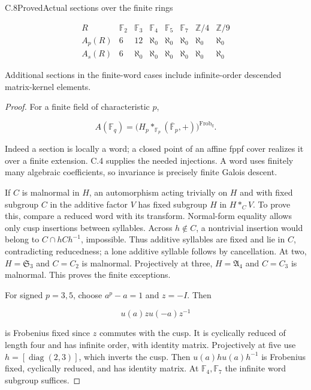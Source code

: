 \begin{statement}{C.8}{Proved}{Actual sections over the finite rings}

$$
\begin{array}{c|rrrrrrr}
R&\mathbb F_2&\mathbb F_3&\mathbb F_4&\mathbb F_5&\mathbb F_7&
\mathbb Z/4&\mathbb Z/9\\\hline
A_p(R)&6&12&\aleph_0&\aleph_0&\aleph_0&\aleph_0&\aleph_0\\
A_s(R)&6&\aleph_0&\aleph_0&\aleph_0&\aleph_0&\aleph_0&\aleph_0
\end{array}
$$

Additional sections in the finite-word cases include
infinite-order descended matrix-kernel elements.
\end{statement}
\begin{proof}
For a finite field of characteristic $p$,

$$
A(\mathbb F_q)=
 \bigl(H_p*_{\mathbb F_p}(\overline{\mathbb F}_p,+)\bigr)
 ^{\operatorname{Frob}_q}.
$$

Indeed a section is locally a word; a closed point of an affine
fppf cover realizes it over a finite extension.
C.4 supplies the needed injections. A word uses finitely
many algebraic coefficients, so invariance is precisely finite
Galois descent.

If $C$ is malnormal in $H$, an automorphism acting trivially
on $H$ and with fixed subgroup $C$ in the additive factor
$V$ has fixed subgroup $H$ in $H*_C V$.
To prove this, compare a reduced word with its transform.
Normal-form equality allows only cusp insertions between
syllables. Across $h\notin C$, a nontrivial insertion would
belong to $C\cap hCh^{-1}$, impossible.
Thus additive syllables are fixed and lie in $C$, contradicting
reducedness; a lone additive syllable follows by cancellation.
At two, $H=\mathfrak S_3$ and $C=C_2$ is malnormal.
Projectively at three, $H=\mathfrak A_4$ and $C=C_3$
is malnormal. This proves the finite exceptions.

For signed $p=3,5$, choose $a^p-a=1$ and $z=-I$.
Then

$$
u(a)zu(-a)z^{-1}
$$

is Frobenius fixed since $z$ commutes with the cusp.
It is cyclically reduced of length four and has infinite
order, with identity matrix.
Projectively at five use
$h=[\operatorname{diag}(2,3)]$, which inverts the cusp.
Then $u(a)hu(a)h^{-1}$ is Frobenius fixed, cyclically
reduced, and has identity matrix.
At $\mathbb F_4,\mathbb F_7$ the infinite word subgroup suffices.


\end{proof}
